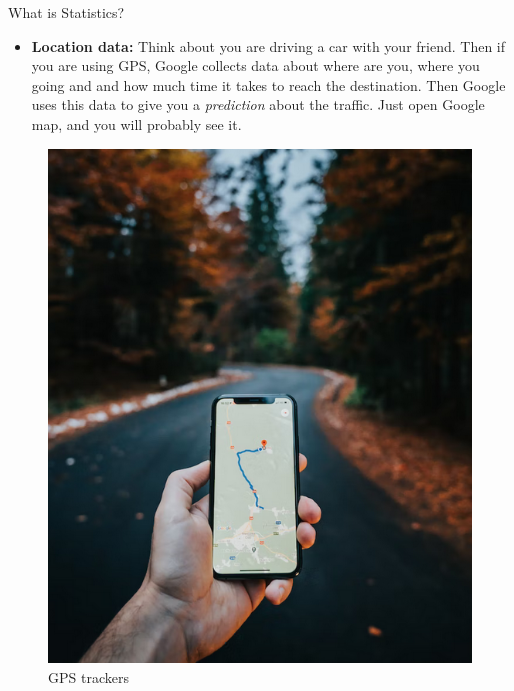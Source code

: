 \documentclass[8pt, usepdftitle=false]{beamer}
\begin{document}

\begin{frame}{What is Statistics?}

\begin{itemize}
\item
  \textbf{Location data:} Think about you are driving a car with your
  friend. Then if you are using GPS, Google collects data about where
  are you, where you going and and how much time it takes to reach the destination. Then Google uses this data to give you a \emph{prediction} about the traffic. Just open Google map, and you will probably see it.
\end{itemize}

\begin{figure}
\includegraphics[scale = .2]{Images/GPS_data.png}
\caption{GPS trackers}
\end{figure}
\end{frame}
\end{document}
